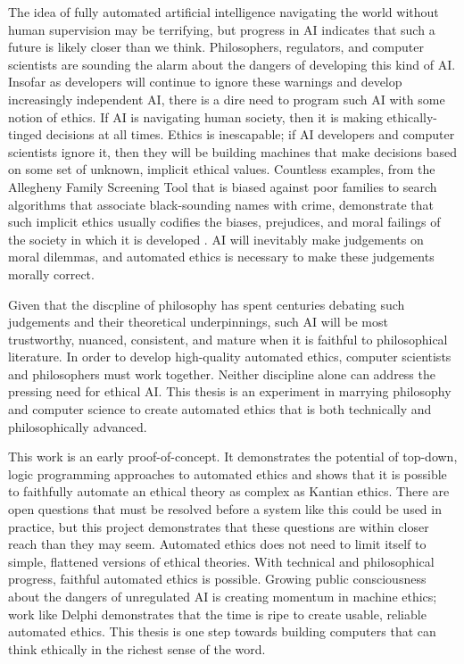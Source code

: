 \begin{isabellebody}
\begin{isamarkuptext}
The idea of fully automated artificial intelligence navigating the world without human supervision
may be terrifying, but progress in AI indicates that such a future is likely closer than we think. 
Philosophers, regulators, and computer scientists are sounding the alarm about the dangers of developing
this kind of AI. Insofar as developers will continue to ignore these warnings and develop increasingly 
independent AI, there is a dire need to program such AI with some notion of ethics. If AI is navigating
human society, then it is making ethically-tinged decisions at all times. Ethics is inescapable; 
if AI developers and computer scientists ignore it, then they will be building machines that make decisions
based on some set of unknown, implicit ethical values. Countless examples, from the Allegheny Family Screening Tool
that is biased against poor families to search algorithms that associate black-sounding names
with crime, demonstrate that such implicit ethics usually codifies the biases, prejudices, and moral
failings of the society in which it is developed \citep{eubanks, sweeney}. AI will inevitably make judgements on moral dilemmas, 
and automated ethics is necessary to make these judgements morally correct. 

Given that the discpline of philosophy has spent centuries debating such judgements and their theoretical 
underpinnings, such AI will be most trustworthy, nuanced, consistent, and mature when it is faithful to 
philosophical literature. In order to develop high-quality automated ethics, computer scientists and 
philosophers must work together. Neither discipline alone can address the pressing need for ethical AI. 
This thesis is an experiment in marrying philosophy and computer science 
to create automated ethics that is both technically and philosophically advanced. 

This work is an early proof-of-concept. It demonstrates the potential of top-down, logic programming 
approaches to automated ethics and shows that it is possible to faithfully automate an ethical theory as
complex as Kantian ethics. There are open questions that must be resolved before a system like this 
could be used in practice, but this project demonstrates that these questions are within closer reach
than they may seem. Automated ethics does not need to limit itself to simple, flattened versions of 
ethical theories. With technical and philosophical progress, faithful automated ethics is possible.
Growing public consciousness about the dangers of unregulated AI is creating momentum in machine ethics; 
work like Delphi demonstrates that the time is ripe to create usable, reliable automated ethics. This 
thesis is one step towards building computers that can think ethically in the richest sense of the word.%
\end{isamarkuptext}\isamarkuptrue%
%
\isadelimtheory
%
\endisadelimtheory
%
\isatagtheory
%
\endisatagtheory
{\isafoldtheory}%
%
\isadelimtheory
%
\endisadelimtheory
%
\end{isabellebody}%
